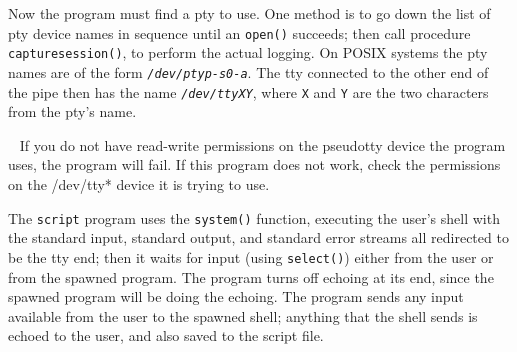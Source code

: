 Now the program must find a pty to use. One method is to go
down the list of pty device names in sequence until an
\texttt{open()} succeeds; then call procedure \texttt{capturesession()},
to perform the actual logging. On POSIX systems the pty
names are of the form \texttt{\textit{/dev/ptyp-s0-a}}. The tty
connected to the other end of the pipe then has the name
\texttt{\textit{/dev/ttyXY}}, where \texttt{X} and \texttt{Y} are the
two characters from the pty's name.



\bigskip{}\
{\sffamily
If you do not have read-write permissions on the pseudotty device the
program uses, the program will fail. If this program does not work,
check the permissions on the /dev/tty* device it is trying to use. }

The \texttt{script} program uses the \texttt{system()}
function, executing the user's shell with the standard
input, standard output, and standard error streams all redirected to be
the tty end; then it waits for input (using
\texttt{select()}) either from the user or from the
spawned program. The program turns off echoing at its end, since the
spawned program will be doing the echoing. The program sends any input
available from the user to the spawned shell; anything that the shell
sends is echoed to the user, and also saved to the script file.

